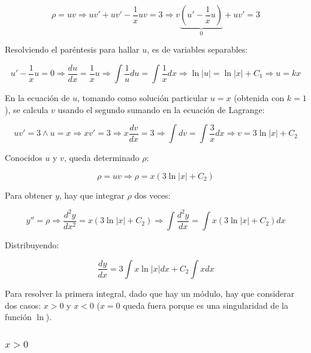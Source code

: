 \documentclass{article}
\begin{document}
\begin{equation}
\rho = u v \Rightarrow uv' + uv' - \frac{1}{x} uv = 3 \Rightarrow v \underbrace{ \left(u' - \frac{1}{x} u \right) }_{0} + uv' = 3
\end{equation}

Resolviendo el paréntesis para hallar $u$, es de variables separables:

\begin{equation}
u' - \frac{1}{x} u = 0 \Rightarrow \frac{du}{dx} = \frac{1}{x} u \Rightarrow \int \frac{1}{u} du = \int \frac{1}{x} dx \Rightarrow \ln |u| = \ln |x| + C_1 \Rightarrow u = k x
\end{equation}

En la ecuación de $u$, tomando como solución particular $u = x$ (obtenida con $k=1$), se calcula $v$ usando el segundo sumando en la ecuación de Lagrange:

\begin{equation}
u v' = 3 \wedge u = x \Rightarrow x v' = 3 \Rightarrow x \frac{dv}{dx} = 3 \Rightarrow \int dv = \int \frac{3}{x} dx \Rightarrow v = 3 \ln |x| + C_2
\end{equation}

Conocidos $u$ y $v$, queda determinado $\rho$:

\begin{equation}
\rho = u v \Rightarrow \rho = x (3 \ln |x| + C_2)
\end{equation}

Para obtener $y$, hay que integrar $\rho$ dos veces:

\begin{equation}
y'' = \rho \Rightarrow \frac{d^2y}{dx^2} = x (3 \ln |x| + C_2) \Rightarrow \int \frac{d^2y}{dx} = \int x (3 \ln |x| + C_2) dx
\end{equation}

Distribuyendo:

\begin{equation}
\frac{dy}{dx} = 3 \int x \ln |x| dx + C_2 \int x dx
\end{equation}

Para resolver la primera integral, dado que hay un módulo, hay que considerar dos casos: $x>0$ y $x <0$ ($x=0$ queda fuera porque es una singularidad de la función $\ln$).

\subsubsection{\texorpdfstring{$x > 0$}{x > 0}}
\end{document}
